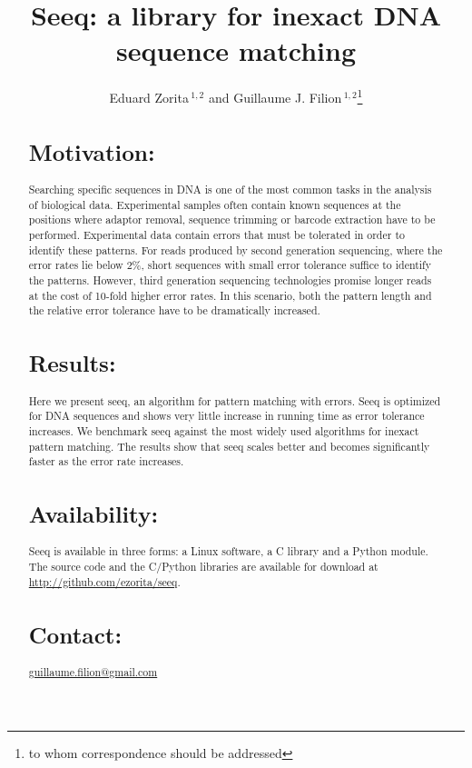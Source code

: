 \documentclass{bioinfo}
\begin{document}

\title[short Title]{Seeq: a library for inexact DNA sequence matching}
\author[Zorita \textit{et~al}]{Eduard Zorita\,$^{1,2}$ and Guillaume J. Filion\,$^{1,2}$\footnote{to whom correspondence should be addressed}}
\address{$^{1}$Genome Architecture, Gene Regulation, Stem Cells and
  Cancer Programme, Centre for Genomic Regulation (CRG), Dr. Aiguader
  88, 08003 Barcelona, Spain\\
$^{2}$Universitat Pompeu Fabra (UPF), 08002 Barcelona, Spain}



\maketitle

\begin{abstract}

\section{Motivation:}
Searching specific sequences in DNA is one of the most common tasks
in the analysis of biological data. Experimental samples often contain
known sequences at the positions where adaptor removal, sequence
trimming or barcode extraction have to be performed. Experimental data
contain errors that must be tolerated in order to identify these
patterns. For reads produced by second generation sequencing,
where the error rates lie below 2\%, short sequences with small error
tolerance suffice to identify the patterns. However, third generation
sequencing technologies promise longer reads at the cost of 10-fold
higher error rates. In this scenario, both the pattern length and the
relative error tolerance have to be dramatically increased.
\section{Results:}
Here we present seeq, an algorithm for pattern matching with errors.
Seeq is optimized for DNA sequences and shows very little increase in
running time as error tolerance increases. We benchmark seeq against
the most widely used algorithms for inexact pattern matching. The
results show that seeq scales better and becomes significantly faster
as the error rate increases.
\section{Availability:}
Seeq is available in three forms: a Linux software, a C library and a 
Python module. The source code and the C/Python libraries are available
for download at
\href{http://github.com/ezorita/seeq}{http://github.com/ezorita/seeq}.
\section{Contact:} \href{guillaume.filion@gmail.com}{guillaume.filion@gmail.com}
\end{abstract}
\end{document}
